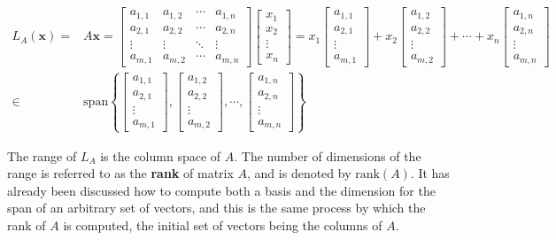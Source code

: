\documentclass{article}
\begin{document}
\begin{align*}
L_A(\mathbf{x}) = & A\mathbf{x} 
= \begin{bmatrix} 
a_{1,1} & a_{1,2} & \cdots & a_{1,n} \\ 
a_{2,1} & a_{2,2} & \cdots & a_{2,n} \\ 
\vdots & \vdots & \ddots & \vdots \\ 
a_{m,1} & a_{m,2} & \cdots & a_{m,n}
\end{bmatrix}\begin{bmatrix}
x_1 \\ x_2 \\ \vdots \\ x_n 
\end{bmatrix} 
= x_1 \begin{bmatrix} 
a_{1,1} \\ a_{2,1} \\ \vdots \\ a_{m,1} 
\end{bmatrix} + x_2 \begin{bmatrix} 
a_{1,2} \\ a_{2,2} \\ \vdots \\ a_{m,2} 
\end{bmatrix} + \cdots + x_n \begin{bmatrix} 
a_{1,n} \\ a_{2,n} \\ \vdots \\ a_{m,n} 
\end{bmatrix} \\ 
\in & \text{span}\left\{\begin{bmatrix} 
a_{1,1} \\ a_{2,1} \\ \vdots \\ a_{m,1} 
\end{bmatrix}, \begin{bmatrix} 
a_{1,2} \\ a_{2,2} \\ \vdots \\ a_{m,2} 
\end{bmatrix}, \cdots, \begin{bmatrix} 
a_{1,n} \\ a_{2,n} \\ \vdots \\ a_{m,n} 
\end{bmatrix}\right\}
\end{align*}

The range of \(L_A\) is the column space of \(A\). The number of dimensions of the range is referred to as the {\bf rank} of matrix \(A\), and is denoted by \(\text{rank}(A)\). It has already been discussed how to compute both a basis and the dimension for the span of an arbitrary set of vectors, and this is the same process by which the rank of \(A\) is computed, the initial set of vectors being the columns of \(A\). 
\end{document}
